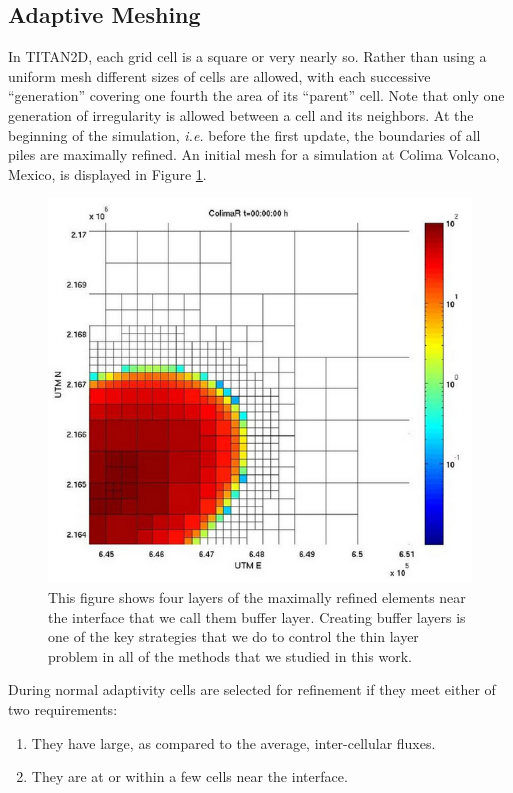 \documentclass[review]{elsarticle}
\begin{document}
\subsection{Adaptive Meshing} \label{adaptivemeshing}
In TITAN2D, each grid cell is a square or very nearly so. Rather than 
using a uniform mesh different sizes of cells are allowed, with each 
successive ``generation'' covering one fourth the area of its ``parent'' 
cell.  Note that only one generation of irregularity is allowed between 
a cell and its neighbors.
At the beginning of the simulation, \textit{i.e.} before the first update, the 
boundaries of all piles are maximally refined. An initial mesh for a 
simulation at Colima Volcano, Mexico, is displayed in Figure \ref{bufcell}. 
\begin{figure}[!h]
        \begin{center}
                \includegraphics[scale=.3]{IMAGES/buffercells.png}
                \caption{This figure shows four layers of the maximally refined elements near the interface that we call them buffer layer. Creating buffer layers is one of the key strategies that we do to control the thin layer problem in all of the methods that we studied in this work.}
                \label{bufcell}
        \end{center}
\end{figure} 
During normal adaptivity cells are selected for refinement if they meet 
either of two requirements:
\begin{enumerate} 
        \item They have large, as compared to the average, inter-cellular fluxes.
        \item They are at or within a few cells near the interface.
\end{enumerate}
\end{document}
